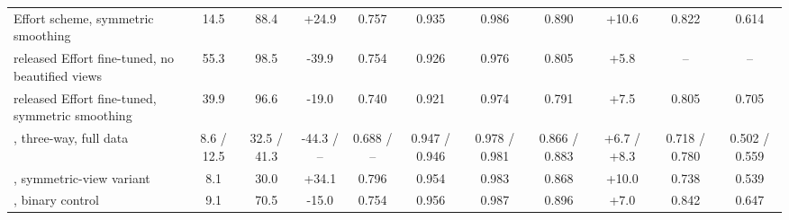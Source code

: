 \begin{tabular}{@{}l cc cc cc cc cc@{}}
Effort scheme, symmetric smoothing & 14.5 & 88.4 & +24.9 & 0.757 & 0.935 & 0.986 & 0.890 & +10.6 & 0.822 & 0.614 \\
released Effort fine-tuned, no beautified views & 55.3 & 98.5 & -39.9 & 0.754 & 0.926 & 0.976 & 0.805 & +5.8 & -- & -- \\
released Effort fine-tuned, symmetric smoothing & 39.9 & 96.6 & -19.0 & 0.740 & 0.921 & 0.974 & 0.791 & +7.5 & 0.805 & 0.705 \\
\ours{}, three-way, full data & 8.6 / 12.5 & 32.5 / 41.3 & -44.3 / -- & 0.688 / -- & 0.947 / 0.946 & 0.978 / 0.981 & 0.866 / 0.883 & +6.7 / +8.3 & 0.718 / 0.780 & 0.502 / 0.559 \\
\ours{}, symmetric-view variant & 8.1 & 30.0 & +34.1 & 0.796 & 0.954 & 0.983 & 0.868 & +10.0 & 0.738 & 0.539 \\
\ours{}, binary control & 9.1 & 70.5 & -15.0 & 0.754 & 0.956 & 0.987 & 0.896 & +7.0 & 0.842 & 0.647 \\
\bottomrule
\end{tabular}
